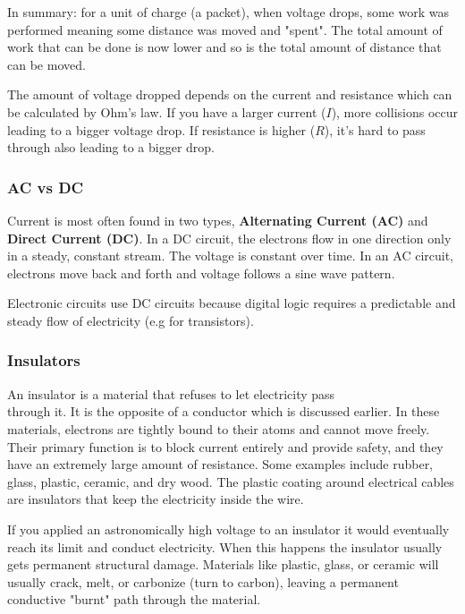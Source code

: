 \documentclass{article}
\begin{document}
In summary: for a unit of charge (a packet), when voltage drops, some work was performed meaning some distance was moved and "spent". The total amount of work that can be done is now lower and so is the total amount of distance that can be moved.

The amount of voltage dropped depends on the current and resistance which can be calculated by Ohm's law. If you have a larger current ($I$), more collisions occur leading to a bigger voltage drop. If resistance is higher ($R$), it's hard to pass through also leading to a bigger drop.

\subsubsection{AC vs DC}

Current is most often found in two types, \textbf{Alternating Current (AC)} and \textbf{Direct Current (DC)}. In a DC circuit, the electrons flow in one direction only in a steady, constant stream. The voltage is constant over time. In an AC circuit, electrons move back and forth and voltage follows a sine wave pattern.

Electronic circuits use DC circuits because digital logic requires a predictable and steady flow of electricity (e.g for transistors).

\subsubsection{Insulators}

An insulator is a material that refuses to let electricity pass \\through it. It is the opposite of a conductor which is discussed earlier. In these materials, electrons are tightly bound to their atoms and cannot move freely. Their primary function is to block current entirely and provide safety, and they have an extremely large amount of resistance. Some examples include rubber, glass, plastic, ceramic, and dry wood. The plastic coating around electrical cables are insulators that keep the electricity inside the wire.

If you applied an astronomically high voltage to an insulator it would eventually reach its limit and conduct electricity. When this happens the insulator usually gets permanent structural damage. Materials like plastic, glass, or ceramic will usually crack, melt, or carbonize (turn to carbon), leaving a permanent conductive "burnt" path through the material.
\end{document}
